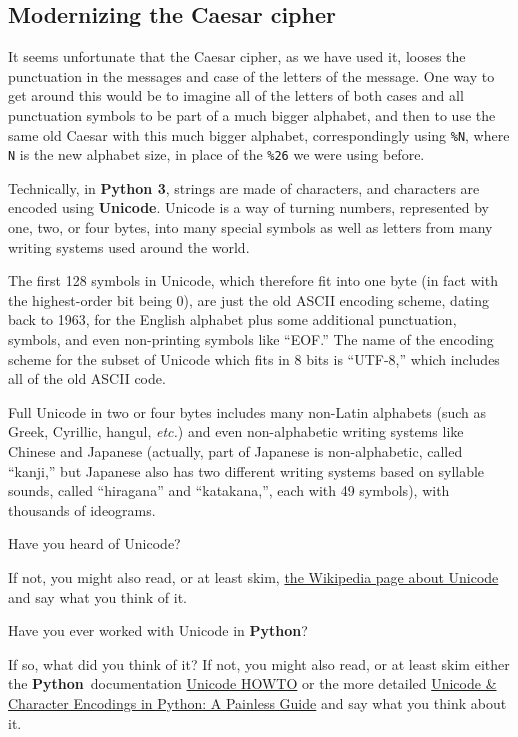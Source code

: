 \documentclass[12pt,letterpaper]{amsbook}
\theoremstyle{definition}
\theoremstyle{remark}
\numberwithin{figure}{section}
\numberwithin{exercise}{chapter}
\numberwithin{section}{chapter}
\numberwithin{equation}{section}
\numberwithin{table}{subsection}
\newcommand{\code}[1]{\colorbox{lg}{\texttt{#1}}}
\newcommand{\Python}{{\textbf{\ix{Python}}}}
\newcommand{\Pythonthree}{{\textbf{Python 3}}}
\newcommand{\bhref}[2]{\href{#1}{#2}}
\newcommand{\ix}[1]{{#1}\index{#1}}
\begin{document}
\vskip1cm
\subsection{Modernizing the Caesar cipher}\label{ssec:TCcaiv_mtCc}
It seems unfortunate that the Caesar cipher, as we have used it, looses the
punctuation in the messages and case of the letters of the message.  One way
to get around this would be to imagine all of the letters of both cases and
all punctuation symbols to be part of a much bigger alphabet, and then to use
the same old Caesar with this much bigger alphabet, correspondingly using
\code{\%N}, where \code{N} is the new alphabet size, in place of the
\code{\%26} we were using before.

Technically, in \Pythonthree, strings are made of characters, and characters
are encoded using \textbf{Unicode}.  Unicode is a way of turning numbers,
represented by one, two, or four bytes, into many special symbols as well as
letters from many writing systems used around the world.

The first 128 symbols in Unicode, which therefore fit into one byte (in fact
with the highest-order bit being 0), are just the old ASCII encoding scheme,
dating back to 1963, for the English alphabet plus some additional punctuation,
symbols, and even non-printing symbols like ``EOF.''  The name of the encoding
scheme for the subset of Unicode which fits in 8 bits is ``UTF-8,'' which
includes all of the old ASCII code.

Full Unicode in two or four bytes includes many non-Latin alphabets (such as
Greek, Cyrillic, hangul, \textit{etc.}) and even non-alphabetic writing
systems like Chinese and Japanese (actually, part of Japanese is
non-alphabetic, called ``kanji,'' but Japanese also has two different writing
systems based on syllable sounds, called ``hiragana'' and ``katakana,'', each
with 49 symbols), with thousands of ideograms.

\vskip2mm
\begin{AZtcb}[label=az:unicode]{}{}
  Have you heard of Unicode?

  If not, you might also read, or at least skim,
  \bhref{https://en.wikipedia.org/wiki/Unicode}{the Wikipedia page about
    Unicode} and say what you think of it.

  Have you ever worked with Unicode in \Python?

  If so, what did you think of it?  If not, you might also read, or at least
  skim either the \Python\ documentation
  \bhref{https://docs.python.org/3/howto/unicode.html}{Unicode HOWTO} or
  the more detailed
  \bhref{https://realpython.com/python-encodings-guide/}{Unicode \& Character Encodings in Python: A Painless Guide} and say what you think about it.
\end{AZtcb}
\end{document}
